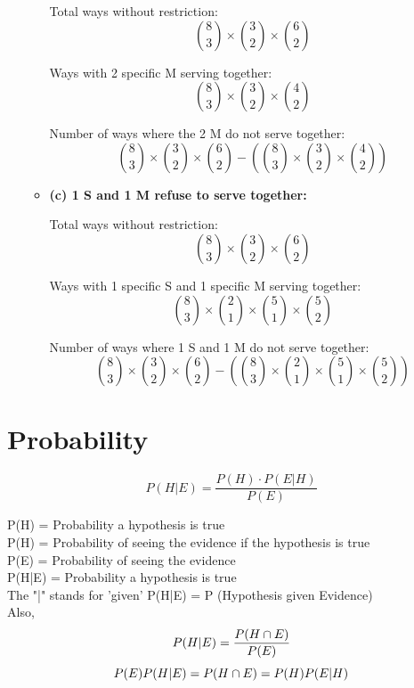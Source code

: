 \documentclass{book}
\begin{document}
\begin{enumerate}
\begin{itemize}
		            Total ways without restriction:
		            \[ \binom{8}{3} \times \binom{3}{2} \times \binom{6}{2} \]

		            Ways with 2 specific M serving together:
		            \[ \binom{8}{3} \times \binom{3}{2} \times \binom{4}{2} \]

		            Number of ways where the 2 M do not serve together:
		            \[
			            \binom{8}{3} \times \binom{3}{2} \times \binom{6}{2} - \left( \binom{8}{3} \times \binom{3}{2} \times \binom{4}{2} \right)
		            \]
		      \item \textbf{(c) 1 S and 1 M refuse to serve together:}

		            Total ways without restriction:
		            \[ \binom{8}{3} \times \binom{3}{2} \times \binom{6}{2} \]

		            Ways with 1 specific S and 1 specific M serving together:
		            \[ \binom{8}{3} \times \binom{2}{1} \times \binom{5}{1} \times \binom{5}{2} \]

		            Number of ways where 1 S and 1 M do not serve together:
		            \[
			            \binom{8}{3} \times \binom{3}{2} \times \binom{6}{2} - \left( \binom{8}{3} \times \binom{2}{1} \times \binom{5}{1} \times \binom{5}{2} \right)
		            \]
	      \end{itemize}
\end{enumerate}
\section{Probability}

\begin{equation}
	P(H|E) = \frac{P(H) \cdot P(E|H)}{P(E)}
\end{equation}

P(H)   = Probability  a  hypothesis  is  true\\
P(H)   = Probability  of   seeing  the  evidence  if   the  hypothesis  is  true\\
P(E)   = Probability   of   seeing   the   evidence\\
P(H|E) = Probability   a  hypothesis   is   true \\

The "|" stands for 'given'
P(H|E)  = P (Hypothesis \space given \space Evidence) \\
Also,
\begin{equation}
	P(H|E)=\frac{P(H \cap E)}{P(E)}\\
	\label{important}
\end{equation}
\begin{equation}
	P(E)P(H|E)=P(H \cap E)=P(H)P(E|H)\\
	\label{important2}
\end{equation}
\end{document}
